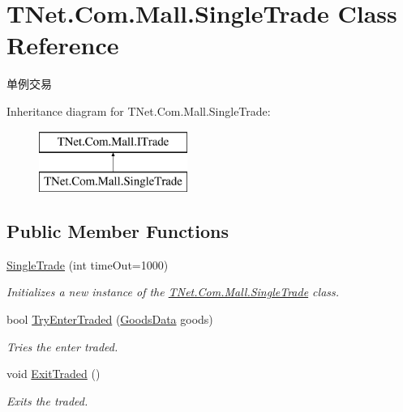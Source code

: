 \hypertarget{class_t_net_1_1_com_1_1_mall_1_1_single_trade}{}\section{T\+Net.\+Com.\+Mall.\+Single\+Trade Class Reference}
\label{class_t_net_1_1_com_1_1_mall_1_1_single_trade}


单例交易  


Inheritance diagram for T\+Net.\+Com.\+Mall.\+Single\+Trade\+:\begin{figure}[H]
\begin{center}
\leavevmode
\includegraphics[height=2.000000cm]{class_t_net_1_1_com_1_1_mall_1_1_single_trade}
\end{center}
\end{figure}
\subsection*{Public Member Functions}
\begin{DoxyCompactItemize}
\item 
\mbox{\hyperlink{class_t_net_1_1_com_1_1_mall_1_1_single_trade_abaee824783a93a3d0172e5199afb1fa6}{Single\+Trade}} (int time\+Out=1000)
\begin{DoxyCompactList}\small\item\em Initializes a new instance of the \mbox{\hyperlink{class_t_net_1_1_com_1_1_mall_1_1_single_trade}{T\+Net.\+Com.\+Mall.\+Single\+Trade}} class. \end{DoxyCompactList}\item 
bool \mbox{\hyperlink{class_t_net_1_1_com_1_1_mall_1_1_single_trade_a1648ff3445ce2e71ba32fb4c1c0dfebf}{Try\+Enter\+Traded}} (\mbox{\hyperlink{class_t_net_1_1_com_1_1_model_1_1_goods_data}{Goods\+Data}} goods)
\begin{DoxyCompactList}\small\item\em Tries the enter traded. \end{DoxyCompactList}\item 
void \mbox{\hyperlink{class_t_net_1_1_com_1_1_mall_1_1_single_trade_aef46b076d11aa1361f458829d0c58a23}{Exit\+Traded}} ()
\begin{DoxyCompactList}\small\item\em Exits the traded. \end{DoxyCompactList}\end{DoxyCompactItemize}



